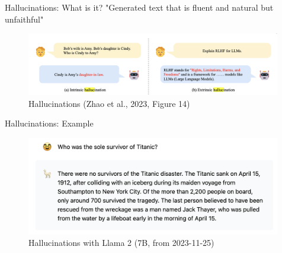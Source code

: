 \documentclass[10pt]{beamer}
\begin{document}
\begin{frame}{Hallucinations: What is it?}
"Generated text that is fluent and natural but unfaithful"

\begin{figure}[h]
\centering
\includegraphics[width=0.99\textwidth]{fig/zhou_2023_fig14}
\caption{Hallucinations (Zhao et al., 2023, Figure 14)}
\end{figure}


\end{frame}






\begin{frame}{Hallucinations: Example}

\begin{figure}[h]
\centering
\includegraphics[width=0.99\textwidth]{fig/hall_llama7B}
\caption{Hallucinations with Llama 2 (7B, from 2023-11-25)}
\end{figure}

\end{frame}
\end{document}
